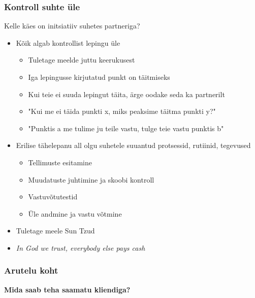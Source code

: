 \begin{frame}[fragile]
  \frametitle{Kontroll suhte üle}
  	Kelle käes on initsiatiiv suhetes partneriga?
	\begin{itemize}
		\item Kõik algab kontrollist lepingu üle
		\begin{itemize}
			\item Tuletage meelde juttu keerukusest
			\item Iga lepingusse kirjutatud punkt on täitmiseks
			\item Kui teie ei suuda lepingut täita, ärge oodake seda ka partnerilt
			\item "Kui me ei täida punkti x, miks peaksime täitma punkti y?"
			\item "Punktis a me tulime ju teile vastu, tulge teie vastu punktis b"
		\end{itemize}
		\item Erilise tähelepanu all olgu suhetele suuantud protsessid, rutiinid, tegevused
		\begin{itemize}
			\item Tellimuste esitamine
			\item Muudatuste juhtimine ja skoobi kontroll
			\item Vastuvõtutestid
			\item Üle andmine ja vastu võtmine
		\end{itemize}
		\item Tuletage meele Sun Tzud
		\item \emph{In God we trust, everybody else pays cash}
	\end{itemize}
\end{frame}

\begin{frame}[fragile]
  \frametitle{Arutelu koht}
		\begin{center}
			\textbf{Mida saab teha saamatu kliendiga?}
		\end{center}
\end{frame}

